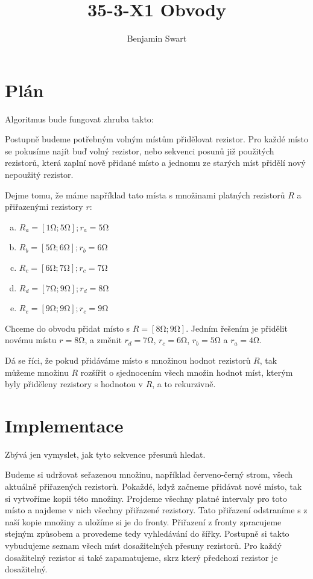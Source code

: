 \documentclass{article}
\title{35-3-X1 Obvody}
\author{Benjamin Swart}
\begin{document}
\maketitle

\section{Plán}

Algoritmus bude fungovat zhruba takto:

Postupně budeme potřebným volným místům přidělovat rezistor. Pro každé místo se pokusíme najít buď volný rezistor, nebo sekvenci posunů již použitých rezistorů, která zaplní nově přidané místo a jednomu ze starých míst přidělí nový nepoužitý rezistor.

Dejme tomu, že máme například tato místa s množinami platných rezistorů $R$ a přiřazenými rezistory $r$:

\begin{enumerate}[a)]
    \item $R_a = \left[1 \unit{\ohm}; 5 \unit{\ohm}\right]; r_a = 5 \unit{\ohm}$
    \item $R_b = \left[5 \unit{\ohm}; 6 \unit{\ohm}\right]; r_b = 6 \unit{\ohm}$
    \item $R_c = \left[6 \unit{\ohm}; 7 \unit{\ohm}\right]; r_c = 7 \unit{\ohm}$
    \item $R_d = \left[7 \unit{\ohm}; 9 \unit{\ohm}\right]; r_d = 8 \unit{\ohm}$
    \item $R_e = \left[9 \unit{\ohm}; 9 \unit{\ohm}\right]; r_e = 9 \unit{\ohm}$
\end{enumerate}

Chceme do obvodu přidat místo s $R = \left[8 \unit{\ohm}; 9 \unit{\ohm}\right]$. Jedním řešením je přidělit novému místu $r = 8 \unit{\ohm}$, a změnit $r_d = 7 \unit{\ohm}$, $r_c = 6 \unit{\ohm}$, $r_b = 5 \unit{\ohm}$ a $r_a = 4 \unit{\ohm}$.

Dá se říci, že pokud přidáváme místo s množinou hodnot rezistorů $R$, tak můžeme množinu $R$ rozšířit o sjednocením všech množin hodnot míst, kterým byly přiděleny rezistory s hodnotou v $R$, a to rekurzivně.

\section{Implementace}

Zbývá jen vymyslet, jak tyto sekvence přesunů hledat.

Budeme si udržovat seřazenou množinu, například červeno-černý strom, všech aktuálně přiřazených rezistorů. Pokaždé, když začneme přidávat nové místo, tak si vytvoříme kopii této množiny. Projdeme všechny platné intervaly pro toto místo a najdeme v nich všechny přiřazené rezistory. Tato přiřazení odstraníme s z naší kopie množiny a uložíme si je do fronty. Přiřazení z fronty zpracujeme stejným způsobem a provedeme tedy vyhledávání do šířky. Postupně si takto vybudujeme seznam všech míst dosažitelných přesuny rezistorů. Pro každý dosažitelný rezistor si také zapamatujeme, skrz který předchozí rezistor je dosažitelný.
\end{document}
